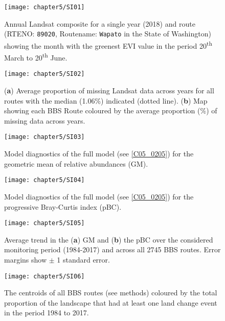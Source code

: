 \begin{figure}[htb]
\centering
\texttt{[image: chapter5/SI01]}
\caption{Annual Landsat composite for a single year (2018) and route (RTENO: \texttt{89020}, Routename: \texttt{Wapato} in the State of Washington) showing the month with the greenest EVI value in the period 20\textsuperscript{th} March to 20\textsuperscript{th} June. }
\label{SI05_01}
\end{figure}

\begin{figure}[htb]
\centering
\texttt{[image: chapter5/SI02]}
\caption{(\textbf{a}) Average proportion of missing Landsat data across years for all routes with the median (1.06\%) indicated (dotted line). (\textbf{b}) Map showing each BBS Route coloured by the average proportion (\%) of missing data across years.}
\label{SI05_02}
\end{figure}

\begin{figure}[htb]
\centering
\texttt{[image: chapter5/SI03]}
\caption{Model diagnostics of the full model (see \ref{C05_0205}) for the geometric mean of relative abundances (GM).}
\label{SI05_03}
\end{figure}

\begin{figure}[htb]
\centering
\texttt{[image: chapter5/SI04]}
\caption{Model diagnostics of the full model (see \ref{C05_0205}) for the progressive Bray-Curtis index (pBC).}
\label{SI05_04}
\end{figure}

\begin{figure}[htb]
\centering
\texttt{[image: chapter5/SI05]}
\caption{Average trend in the (\textbf{a}) GM and (\textbf{b}) the pBC over the considered monitoring period (1984-2017) and across all 2745 BBS routes. Error margins show $\pm$ 1 standard error.}
\label{SI05_05}
\end{figure}

\begin{figure}[htb]
\centering
\texttt{[image: chapter5/SI06]}
\caption{The centroids of all BBS routes (see methods) coloured by the total proportion of the landscape that had at least one land change event in the period 1984 to 2017.}
\label{SI05_06}
\end{figure}

